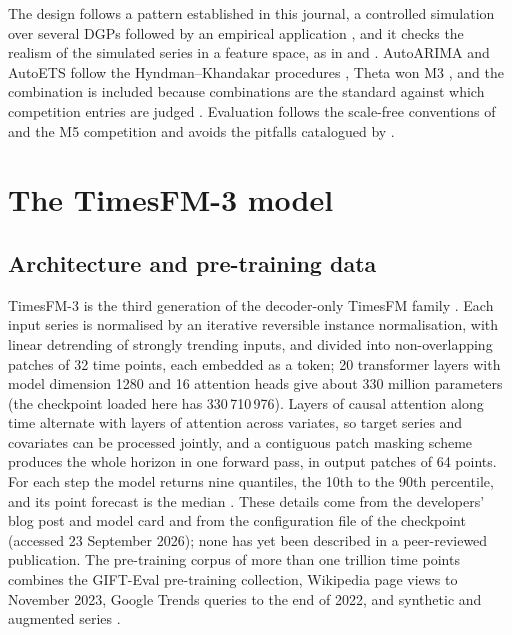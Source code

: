 \documentclass[ASNA]{USG}
\begin{document}
The design follows a pattern established in this journal, a controlled simulation over several DGPs
followed by an empirical application \citep{berger2025deep, chu2026intervals, lisi2025multiple}, and it
checks the realism of the simulated series in a feature space, as in \citet{kang2017instance} and
\citet{talagala2023metalearning}. AutoARIMA and AutoETS follow the Hyndman--Khandakar procedures
\citep{hyndman2008forecast, hyndman2002statespace}, Theta \citep{assimakopoulos2000theta} won M3
\citep{makridakis2000m3}, and the combination is included because combinations are the standard against
which competition entries are judged \citep{makridakis2000m3, makridakis2020m4}. Evaluation follows the
scale-free conventions of \citet{hyndman2006mase} and the M5 competition \citep{makridakis2022m5,
makridakis2022m5unc} and avoids the pitfalls catalogued by \citet{hewamalage2023evaluation}.

\section{The TimesFM-3 model}
\label{sec:timesfm}

\subsection{Architecture and pre-training data}
\label{sec:tfm-architecture}

TimesFM-3 is the third generation of the decoder-only TimesFM family \citep{das2024timesfm,
timesfm3blog}. Each input series is normalised by an iterative reversible instance normalisation, with
linear detrending of strongly trending inputs, and divided into non-overlapping patches of 32 time points,
each embedded as a token; 20 transformer layers with model dimension 1280 and 16 attention heads give
about 330 million parameters (the checkpoint loaded here has 330\,710\,976). Layers of causal attention
along time alternate with layers of attention across variates, so target series and covariates can be
processed jointly, and a contiguous patch masking scheme produces the whole horizon in one forward pass,
in output patches of 64 points. For each step the model returns nine quantiles, the 10th to the 90th
percentile, and its point forecast is the median \citep{timesfm3blog, timesfm3card, timesfm3repo}. These
details come from the developers' blog post and model card and from the configuration file of the
checkpoint (accessed 23 September 2026); none has yet been described in a peer-reviewed publication. The
pre-training corpus of more than one trillion time points combines the GIFT-Eval pre-training collection,
Wikipedia page views to November 2023, Google Trends queries to the end of 2022, and synthetic and
augmented series \citep{timesfm3card}.
\end{document}
